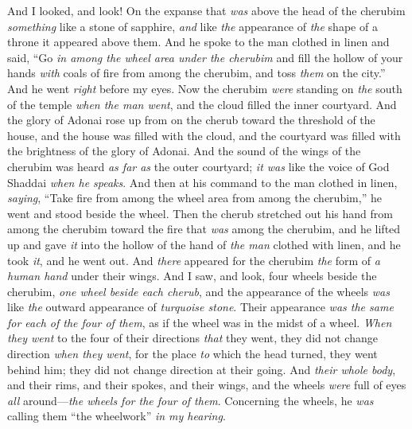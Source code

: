 \begin{biblechapter} %
 And I looked, and look! On the expanse that \textit{was} above the head of the cherubim \textit{something} like a stone of sapphire, \textit{and} like \textit{the} appearance of \textit{the} shape of a throne it appeared above them.
\verse And he spoke to the man clothed in linen and said, “Go \textit{in among the wheel area under the cherubim} and fill the hollow of your hands \textit{with} coals of fire from among the cherubim, and toss \textit{them} on the city.” And he went \textit{right} before my eyes.
\verse Now the cherubim \textit{were} standing on \textit{the} south of the temple \textit{when the man went}, and the cloud filled the inner courtyard.
\verse And the glory of Adonai rose up from on the cherub toward the threshold of the house, and the house was filled with the cloud, and the courtyard was filled with the brightness of the glory of Adonai.
\verse And the sound of the wings of the cherubim was heard \textit{as far as} the outer courtyard; \textit{it was} like the voice of God Shaddai \textit{when he speaks}.
\verse And then at his command to the man clothed in linen, \textit{saying}, “Take fire from among the wheel area from among the cherubim,” he went and stood beside the wheel.
\verse Then the cherub stretched out his hand from among the cherubim toward the fire that \textit{was} among the cherubim, and he lifted up and gave \textit{it} into the hollow of the hand of \textit{the man} clothed with linen, and he took \textit{it}, and he went out.
\verse And \textit{there} appeared for the cherubim \textit{the} form of \textit{a human hand} under their wings.
\verse And I saw, and look, four wheels beside the cherubim, \textit{one wheel beside each cherub}, and the appearance of the wheels \textit{was} like \textit{the} outward appearance of \textit{turquoise stone}.
\verse Their appearance \textit{was the same for each of the four of them}, as if the wheel was in the midst of a wheel.
\verse \textit{When they went} to the four of their directions \textit{that} they went, they did not change direction \textit{when they went}, for the place \textit{to} which the head turned, they went behind him; they did not change direction at their going.
\verse And \textit{their whole body}, and their rims, and their spokes, and their wings, and the wheels \textit{were} full of eyes \textit{all} around—\textit{the wheels for the four of them}.
\verse Concerning the wheels, he \textit{was} calling them “the wheelwork” \textit{in my hearing}.

\end{biblechapter}
